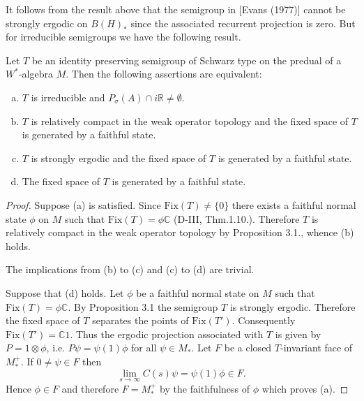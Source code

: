 It follows from the result above that the semigroup in [Evans (1977)] cannot be strongly ergodic on $B(H)_{*}$ since the associated recurrent projection is zero.
But for irreducible semigroups we have the following result.

\newpage

\begin{proposition}\label{prop:d4-3-4}
Let $T$ be an identity preserving semigroup of Schwarz type on the predual of a $W^*$-algebra $M$.
Then the following assertions are equivalent:

\begin{enumerate}[(a)]
\item
$T$ is irreducible and $P_{\sigma}(A) \cap i\mathbb{R} \neq \emptyset$.

\item
$T$ is relatively compact in the weak operator topology and the fixed space of $T$ is generated by a faithful state.

\item
$T$ is strongly ergodic and the fixed space of $T$ is generated by a faithful state.

\item
The fixed space of $T$ is generated by a faithful state.
\end{enumerate}
\end{proposition}

\begin{proof}
Suppose (a) is satisfied.
Since $\text{Fix}(T) \neq \{0\}$ there exists a faithful normal state $\phi$ on $M$ such that $\text{Fix}(T) = \phi\mathbb{C}$ (D-III, Thm.1.10.).
Therefore $T$ is relatively compact in the weak operator topology by Proposition 3.1., whence (b) holds.

The implications from (b) to (c) and (c) to (d) are trivial.

Suppose that (d) holds.
Let $\phi$ be a faithful normal state on $M$ such that $\text{Fix}(T) = \phi\mathbb{C}$.
By Proposition 3.1 the semigroup $T$ is strongly ergodic.
Therefore the fixed space of $T$ separates the points of $\text{Fix}(T')$.
Consequently $\text{Fix}(T') = \mathbb{C}1$.
Thus the ergodic projection associated with $T$ is given by $P = 1 \otimes \phi$, i.e. $P\psi = \psi(1)\phi$ for all $\psi \in M_{*}$.
Let $F$ be a closed $T$-invariant face of $M_{*}^{+}$.
If $0 \neq \psi \in F$ then
\[
\lim_{s \to \infty} C(s)\psi = \psi(1)\phi \in F.
\]
Hence $\phi \in F$ and therefore $F = M_{*}^{+}$ by the faithfulness of $\phi$ which proves (a).
\end{proof}

